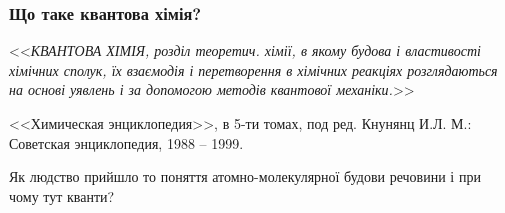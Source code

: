 \documentclass[10pt]{beamer}
\begin{document}
\begin{frame}
	\frametitle{Що таке квантова хімія?}

\begin{block}{}\justifying
    	<<\emph{КВАНТОВА ХІМІЯ, розділ теоретич. хімії, в якому \alert{будова} і \alert{властивості хімічних сполук}, їх взаємодія і перетворення в хімічних реакціях розглядаються на основі уявлень і за допомогою методів квантової механіки.}>>

    \bigskip

	{\small <<Химическая энциклопедия>>, в 5-ти томах, под ред. Кнунянц И.Л. М.: Советская энциклопедия, 1988 -- 1999.}
\end{block}

\begin{alertblock}{}\centering
    Як людство прийшло то поняття атомно-молекулярної будови речовини і при чому тут кванти?
\end{alertblock}

\end{frame}



\end{document}
